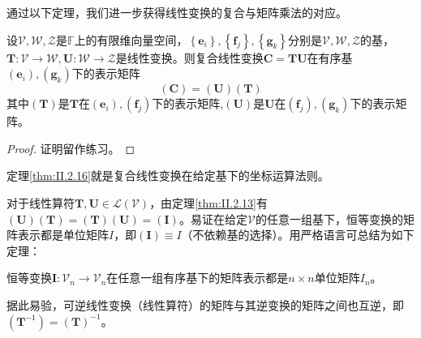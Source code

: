\documentclass[main.tex]{subfiles}
\begin{document}
通过以下定理，我们进一步获得线性变换的复合与矩阵乘法的对应。
\begin{theorem}\label{thm:II.2.16}
    设$\mathcal{V},\mathcal{W},\mathcal{Z}$是$\mathbb{F}$上的有限维向量空间，$\left\{\mathbf{e}_i\right\},\left\{\mathbf{f}_j\right\},\left\{\mathbf{g}_k\right\}$分别是$\mathcal{V},\mathcal{W},\mathcal{Z}$的基，$\mathbf{T}:\mathcal{V}\rightarrow\mathcal{W},\mathbf{U}:\mathcal{W}\rightarrow\mathcal{Z}$是线性变换。则复合线性变换$\mathbf{C}=\mathbf{TU}$在有序基$\left(\mathbf{e}_i\right),\left(\mathbf{g}_k\right)$下的表示矩阵
    \[\left(\mathbf{C}\right)=\left(\mathbf{U}\right)\left(\mathbf{T}\right)\]
    其中$\left(\mathbf{T}\right)$是$\mathbf{T}$在$\left(\mathbf{e}_i\right),\left(\mathbf{f}_j\right)$下的表示矩阵,$\left(\mathbf{U}\right)$是$\mathbf{U}$在$\left(\mathbf{f}_j\right),\left(\mathbf{g}_k\right)$下的表示矩阵。
\end{theorem}
\begin{proof}
    证明留作练习。
\end{proof}

定理\ref{thm:II.2.16}就是复合线性变换在给定基下的坐标运算法则。

对于线性算符$\mathbf{T},\mathbf{U}\in\mathcal{L}\left(\mathcal{V}\right)$，由定理\ref{thm:II.2.13}有$\left(\mathbf{U}\right)\left(\mathbf{T}\right)=\left(\mathbf{T}\right)\left(\mathbf{U}\right)=\left(\mathbf{I}\right)$。易证在给定$\mathcal{V}$的任意一组基下，恒等变换的矩阵表示都是单位矩阵$I$，即$\left(\mathbf{I}\right)\equiv I$（不依赖基的选择）。用严格语言可总结为如下定理：
\begin{theorem}\label{thm:II.2.17}
    恒等变换$\mathbf{I}:\mathcal{V}_n\rightarrow\mathcal{V}_n$在任意一组有序基下的矩阵表示都是$n\times n$单位矩阵$I_n$。
\end{theorem}
据此易验，可逆线性变换（线性算符）的矩阵与其逆变换的矩阵之间也互逆，即$\left(\mathbf{T}^{-1}\right)=\left(\mathbf{T}\right)^{-1}$。
\end{document}
